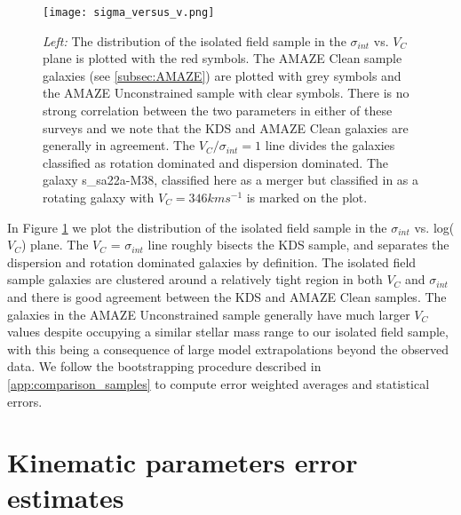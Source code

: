 \documentclass[fleqn,usenatbib]{mn2e}
\begin{document}
\begin{figure}
\centering \hspace{-1.13cm}
\texttt{[image: sigma\_versus\_v.png]}
\caption{{\it Left:} The distribution of the isolated field sample in the $\sigma_{int}$ vs. $V_{C}$ plane is plotted with the red symbols.
The AMAZE Clean sample galaxies (see \protect\cref{subsec:AMAZE}) are plotted with grey symbols and the AMAZE Unconstrained sample with clear symbols.    There is no strong correlation between the two parameters in either of these surveys and we note that the KDS and AMAZE Clean galaxies are generally in agreement.
The $V_{C}/\sigma_{int} = 1$ line divides the galaxies classified as rotation dominated and dispersion dominated.
The galaxy s\_sa22a-M38, classified here as a merger but classified in \protect\cite{Gnerucci2011} as a rotating galaxy with $V_{C} = 346kms^{-1}$ is marked on the plot.}
\label{fig:intrinsic_parameters}
\end{figure}

In Figure \ref{fig:intrinsic_parameters} we plot the distribution of the isolated field sample in the $\sigma_{int}$ vs. log($V_{C}$) plane. 
The $V_{C}$ = $\sigma_{int}$ line roughly bisects the KDS sample, and separates the dispersion and rotation dominated galaxies by definition.
The isolated field sample galaxies are clustered around a relatively tight region in both $V_{C}$ and $\sigma_{int}$ and there is good agreement between the KDS and AMAZE Clean samples.
The galaxies in the AMAZE Unconstrained sample generally have much larger $V_{C}$ values despite occupying a similar stellar mass range to our isolated field sample, with this being a consequence of large model extrapolations beyond the observed data.
We follow the bootstrapping procedure described in \cref{app:comparison_samples} to compute error weighted averages and statistical errors.

\section{Kinematic parameters error estimates}\label{app:kin_error_estimates}
\end{document}
